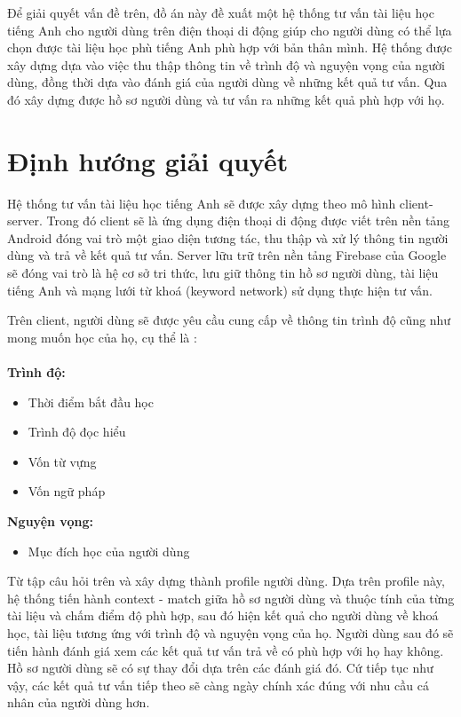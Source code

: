 Để giải quyết vấn đề trên, đồ án	 này đề xuất một hệ thống tư vấn tài liệu học tiếng Anh cho người dùng trên điện thoại di động giúp cho người dùng có thể lựa chọn được tài liệu học phù tiếng Anh phù hợp với bản thân mình. Hệ thống được xây dựng dựa vào việc thu thập thông tin về trình độ và nguyện vọng của người dùng, đồng thời dựa vào đánh giá của người dùng về những kết quả tư vấn. Qua đó xây dựng được hồ sơ người dùng và tư vấn ra những kết quả phù hợp với họ. 

\section{Định hướng giải quyết}

Hệ thống tư vấn tài liệu học tiếng Anh sẽ được xây dựng theo mô hình client-server. Trong đó client sẽ là ứng dụng điện thoại di động được viết trên nền tảng Android đóng vai trò một giao diện tương tác, thu thập và xử lý thông tin người dùng và trả về kết quả tư vấn. Server lữu trữ trên nền tảng Firebase của Google sẽ đóng vai trò là hệ cơ sở tri thức, lưu giữ thông tin hồ sơ người dùng, tài liệu tiếng Anh và mạng lưới từ khoá (keyword network) sử dụng thực hiện tư vấn. 

Trên client, người dùng sẽ được yêu cầu cung cấp về thông tin trình độ cũng như mong muốn học của họ, cụ thể là : \\\\
\textbf{Trình độ:}
\begin{itemize}  
        \item Thời điểm bắt đầu học 
        \item Trình độ đọc hiểu
        \item Vốn từ vựng
        \item Vốn ngữ pháp 
    \end{itemize}
\textbf{Nguyện vọng:}  
\begin{itemize}  
        \item Mục đích học của người dùng
    \end{itemize}
    
Từ tập câu hỏi trên và xây dựng thành profile người dùng. Dựa trên profile này, hệ thống tiến hành context - match giữa hồ sơ người dùng và thuộc tính của từng tài liệu và chấm điểm độ phù hợp, sau đó hiện kết quả cho người dùng về khoá học, tài liệu tương ứng với trình độ và nguyện vọng của họ. Người dùng sau đó sẽ tiến hành đánh giá xem các kết quả tư vấn trả về có phù hợp với họ hay không. Hồ sơ người dùng sẽ có sự thay đổi dựa trên các đánh giá đó. Cứ tiếp tục như vậy, các kết quả tư vấn tiếp theo sẽ càng ngày chính xác đúng với nhu cầu cá nhân của người dùng hơn.

